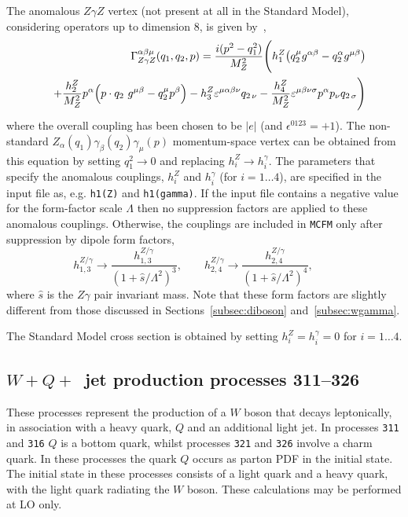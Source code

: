 \documentclass[12pt]{article}
\begin{document}
The anomalous $Z\gamma Z$ vertex (not present at all in the Standard Model),
considering operators up to dimension 8, is given by~\cite{DeFlorian:2000sg},
\begin{eqnarray}
 && \Gamma^{\alpha \beta \mu}_{Z \gamma Z}(q_1, q_2, p) = 
   \frac{i(p^2-q_1^2)}{M_Z^2} \Biggl( 
   h_1^Z \bigl( q_2^\mu g^{\alpha\beta} - q_2^\alpha g^{\mu \beta}
   \bigr)
    \nonumber \\ && + \frac{h_2^Z}{M_Z^2} p^\alpha \Bigl( p\cdot q_2\ g^{\mu\beta} -
            q_2^\mu p^\beta \Bigr)
   - h_3^Z \varepsilon^{\mu\alpha\beta\nu} q_{2\, \nu} 
   - \frac{h_4^Z}{M_Z^2} \varepsilon^{\mu\beta\nu\sigma} p^\alpha
p_\nu q_{2\, \sigma} \Biggl)
\end{eqnarray}
where the overall coupling has been chosen to be $|e|$ (and
$\epsilon^{0123}=+1$). The non-standard $Z_\alpha(q_1) \gamma_\beta(q_2)
\gamma_\mu(p)$ momentum-space vertex can be obtained from
this equation by setting $q_1^2 \to 0$ and replacing $h_i^Z \to
h_i^\gamma$. 
The parameters that
specify the anomalous couplings, $h_i^Z$ and $h_i^\gamma$ (for $i=1\ldots 4$), are
specified in the input file as, e.g. {\tt h1(Z)} and {\tt h1(gamma)}.
If the input file contains a negative value for the form-factor scale $\Lambda$
then no suppression factors are applied to these anomalous couplings.
Otherwise, the couplings are included
in {\tt MCFM} only after suppression by dipole form factors,
\begin{displaymath}
h_{1,3}^{Z/\gamma} \rightarrow
 \frac{h_{1,3}^{Z/\gamma}}{(1+\hat{s}/\Lambda^2)^3}, \qquad
h_{2,4}^{Z/\gamma} \rightarrow
 \frac{h_{2,4}^{Z/\gamma}}{(1+\hat{s}/\Lambda^2)^4}, \qquad
\end{displaymath}
where $\hat{s}$ is the $Z\gamma$ pair invariant mass. Note that these form factors are slightly
different from those discussed in Sections~\ref{subsec:diboson} and~\ref{subsec:wgamma}.

The Standard Model cross section is obtained by setting $h_i^Z = h_i^\gamma = 0$ for $i=1\ldots 4$.



\subsection{$W+Q+$~jet production processes 311--326}
\label{subsec:wQj}

These processes represent the production of a $W$
boson that decays leptonically,
in association with a heavy quark, $Q$ and an additional light jet. In
processes {\tt 311} and {\tt 316} $Q$ is a bottom quark, whilst
processes {\tt 321} and {\tt 326} involve a charm quark.
In these processes the quark $Q$ occurs as parton PDF in the initial state. 
The initial state in these processes consists of a light quark and a heavy 
quark, with the light quark radiating the $W$ boson. These calculations may
be performed at LO only.
\end{document}
